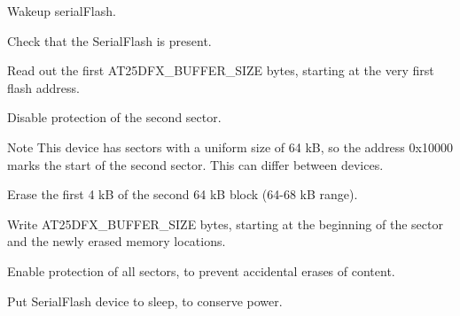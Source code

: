 \begin{DoxyEnumerate}
\item Wakeup serial\+Flash. 
\begin{DoxyCodeInclude}{0}
\end{DoxyCodeInclude}

\item Check that the Serial\+Flash is present. 
\begin{DoxyCodeInclude}{0}
\end{DoxyCodeInclude}

\item Read out the first A\+T25\+D\+F\+X\+\_\+\+B\+U\+F\+F\+E\+R\+\_\+\+S\+I\+ZE bytes, starting at the very first flash address. 
\begin{DoxyCodeInclude}{0}
\end{DoxyCodeInclude}

\item Disable protection of the second sector. \begin{DoxyNote}{Note}
This device has sectors with a uniform size of 64 kB, so the address {\ttfamily 0x10000} marks the start of the second sector. This can differ between devices.
\end{DoxyNote}

\begin{DoxyCodeInclude}{0}
\end{DoxyCodeInclude}

\item Erase the first 4 kB of the second 64 kB block (64-\/68 kB range). 
\begin{DoxyCodeInclude}{0}
\end{DoxyCodeInclude}

\item Write A\+T25\+D\+F\+X\+\_\+\+B\+U\+F\+F\+E\+R\+\_\+\+S\+I\+ZE bytes, starting at the beginning of the sector and the newly erased memory locations. 
\begin{DoxyCodeInclude}{0}
\end{DoxyCodeInclude}

\item Enable protection of all sectors, to prevent accidental erases of content. 
\begin{DoxyCodeInclude}{0}
\end{DoxyCodeInclude}

\item Put Serial\+Flash device to sleep, to conserve power. 
\begin{DoxyCodeInclude}{0}
\end{DoxyCodeInclude}

\end{DoxyEnumerate}